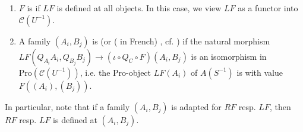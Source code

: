 \begin{definition}
\begin{enumerate}
\begin{enumerate}
        \item $F$ is  if $LF$ is defined at all objects. In this case, we view $LF$ as a functor into $\mathscr{C}(U^{-1})$.

        \item A family $(A_i, B_j)$ is  (or  ( in French) , cf. \cite{spaltenstein_ruc}) if the natural morphism $LF(Q_{A_i}A_i, Q_{B_j}B_j) \to (\iota \circ Q_C \circ F)(A_i, B_j)$ is an isomorphism in $\text{Pro}(\mathscr{C}(U^{-1}))$, i.e. the Pro-object $LF(A_i)$ of $A(S^{-1})$ is  with value $F((A_i),(B_j))$.

    \end{enumerate}
\end{enumerate}
In particular, note that if a family $(A_i, B_j)$ is adapted for $RF$ resp. $LF$, then $RF$ resp. $LF$ is defined at $(A_i, B_j)$.
\end{definition}